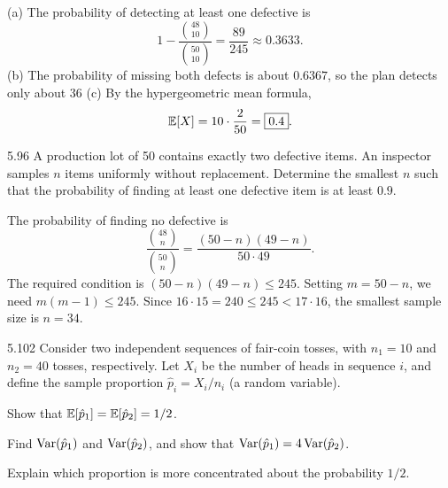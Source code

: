 \documentclass[11pt,oneside]{article}
\begin{document}
\begin{solution}
\textup{(a)} The probability of detecting at least one defective is
\[
1-\frac{\binom{48}{10}}{\binom{50}{10}}=\boxed{\frac{89}{245}}\approx0.3633.
\]
\noindent\textup{(b)} The probability of missing both defects is about $0.6367$, so the plan detects only about 36%
\noindent\textup{(c)} By the hypergeometric mean formula,
\[
\mathbb{E}[X]=10\cdot\frac2{50}=\boxed{0.4}.
\]
\end{solution}

\begin{exercise}{5.96}
A production lot of 50 contains exactly two defective items. An inspector samples $n$ items uniformly without replacement. Determine the smallest $n$ such that the probability of finding at least one defective item is at least $0.9$.
\end{exercise}

\begin{solution}
The probability of finding no defective is
\[
\frac{\binom{48}{n}}{\binom{50}{n}}
=\frac{(50-n)(49-n)}{50\cdot49}.
\]
The required condition is $(50-n)(49-n)\le245$. Setting $m=50-n$, we need $m(m-1)\le245$. Since $16\cdot15=240\le245<17\cdot16$, the smallest sample size is $\boxed{n=34}$.
\end{solution}

\begin{exercise}{5.102}
Consider two independent sequences of fair-coin tosses, with $n_1=10$ and $n_2=40$ tosses, respectively. Let $X_i$ be the number of heads in sequence $i$, and define the sample proportion $\hat p_i=X_i/n_i$ (a random variable).

\par
\begin{exercisesubparts}
\item Show that $\mathbb{E}[\hat p_1]=\mathbb{E}[\hat p_2]=1/2$.
\item Find $\operatorname{Var}(\hat p_1)$ and $\operatorname{Var}(\hat p_2)$, and show that $\operatorname{Var}(\hat p_1)=4\operatorname{Var}(\hat p_2)$.
\item Explain which proportion is more concentrated about the probability $1/2$.
\end{exercisesubparts}
\end{exercise}
\end{document}
